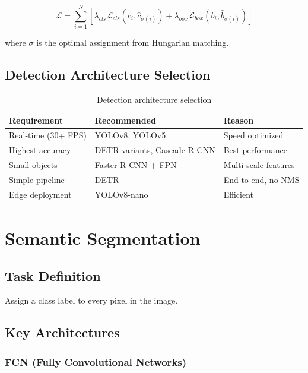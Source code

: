 \begin{equation}
\mathcal{L} = \sum_{i=1}^{N} [\lambda_{cls} \mathcal{L}_{cls}(c_i, \hat{c}_{\sigma(i)}) + \lambda_{box} \mathcal{L}_{box}(b_i, \hat{b}_{\sigma(i)})]
\end{equation}

where $\sigma$ is the optimal assignment from Hungarian matching.

\subsection{Detection Architecture Selection}

\begin{table}[H]
\centering
\caption{Detection architecture selection}
\begin{tabularx}{\textwidth}{lXX}
\toprule
\textbf{Requirement} & \textbf{Recommended} & \textbf{Reason} \\
\midrule
Real-time (30+ FPS) & YOLOv8, YOLOv5 & Speed optimized \\
Highest accuracy & DETR variants, Cascade R-CNN & Best performance \\
Small objects & Faster R-CNN + FPN & Multi-scale features \\
Simple pipeline & DETR & End-to-end, no NMS \\
Edge deployment & YOLOv8-nano & Efficient \\
\bottomrule
\end{tabularx}
\end{table}

\section{Semantic Segmentation}
\label{sec:semantic_segmentation}

\subsection{Task Definition}

Assign a class label to every pixel in the image.

\subsection{Key Architectures}

\subsubsection{FCN (Fully Convolutional Networks)}

